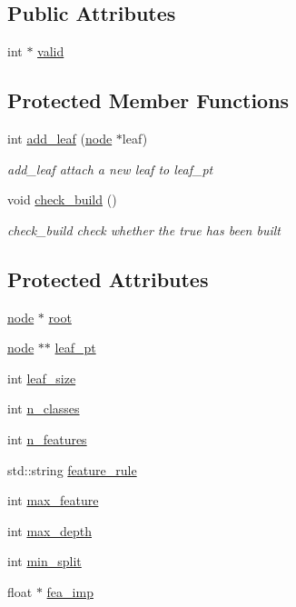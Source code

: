 \subsection*{Public Attributes}
\begin{DoxyCompactItemize}
\item 
int $\ast$ \hyperlink{classtree_afa8e539406e1f8b373b147682e3a8196}{valid}
\end{DoxyCompactItemize}
\subsection*{Protected Member Functions}
\begin{DoxyCompactItemize}
\item 
int \hyperlink{classtree_a9055d00c2b5d3925c75991c5bb7b0b8a}{add\+\_\+leaf} (\hyperlink{classnode}{node} $\ast$leaf)
\begin{DoxyCompactList}\small\item\em add\+\_\+leaf attach a new leaf to {\ttfamily leaf\+\_\+pt} \end{DoxyCompactList}\item 
void \hyperlink{classtree_a1d5e50aae649ad79d312cef8177d700a}{check\+\_\+build} ()
\begin{DoxyCompactList}\small\item\em check\+\_\+build check whether the true has been built \end{DoxyCompactList}\end{DoxyCompactItemize}
\subsection*{Protected Attributes}
\begin{DoxyCompactItemize}
\item 
\hyperlink{classnode}{node} $\ast$ \hyperlink{classtree_ad397d4906e47149b98f769b3e81473ee}{root}
\item 
\hyperlink{classnode}{node} $\ast$$\ast$ \hyperlink{classtree_ac697cf1868c26ac26f005e6ee8be9d43}{leaf\+\_\+pt}
\item 
int \hyperlink{classtree_a551919e1402a700821694297623017fc}{leaf\+\_\+size}
\item 
int \hyperlink{classtree_a3f074099473facb464acf152157bf4d0}{n\+\_\+classes}
\item 
int \hyperlink{classtree_a48430ab4447259c35af5f22e894e1d6c}{n\+\_\+features}
\item 
std\+::string \hyperlink{classtree_a5aba3b77a347165517a20d5fab94382d}{feature\+\_\+rule}
\item 
int \hyperlink{classtree_a6f4304318f8f091f7d783ac1ec7d2775}{max\+\_\+feature}
\item 
int \hyperlink{classtree_a0a9f968fac827d3239be67488c34fb21}{max\+\_\+depth}
\item 
int \hyperlink{classtree_ae70cd626c0b50a0b8306a94a9e5e8fd7}{min\+\_\+split}
\item 
float $\ast$ \hyperlink{classtree_ad335e57b2f4f2326825694311bcc69e7}{fea\+\_\+imp}
\end{DoxyCompactItemize}


